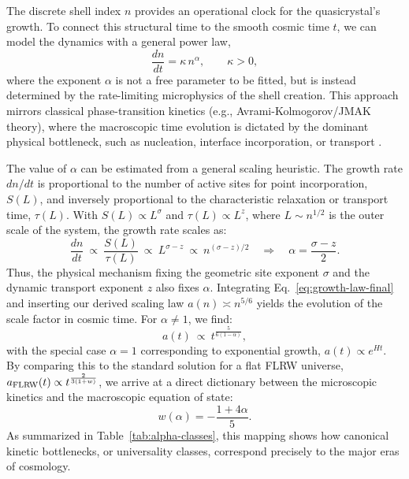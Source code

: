 \documentclass[universe,article,submit,pdftex,moreauthors]{Definitions/mdpi}
\begin{document}
The discrete shell index $n$ provides an operational clock for the quasicrystal's growth. To connect this structural time to the smooth cosmic time $t$, we can model the dynamics with a general power law,
\begin{equation}
  \frac{dn}{dt}=\kappa\,n^{\alpha},\qquad \kappa>0,
  \label{eq:growth-law-final}
\end{equation}
where the exponent $\alpha$ is not a free parameter to be fitted, but is instead determined by the rate-limiting microphysics of the shell creation. This approach mirrors classical phase-transition kinetics (e.g., Avrami-Kolmogorov/JMAK theory), where the macroscopic time evolution is dictated by the dominant physical bottleneck, such as nucleation, interface incorporation, or transport \cite{Shirzad2023}.

The value of $\alpha$ can be estimated from a general scaling heuristic. The growth rate $dn/dt$ is proportional to the number of active sites for point incorporation, $S(L)$, and inversely proportional to the characteristic relaxation or transport time, $\tau(L)$. With $S(L) \propto L^{\sigma}$ and $\tau(L) \propto L^{z}$, where $L \sim n^{1/2}$ is the outer scale of the system, the growth rate scales as:
\[
  \frac{dn}{dt}\ \propto\ \frac{S(L)}{\tau(L)}\ \propto\ L^{\sigma-z}\ \propto\ n^{(\sigma-z)/2}
  \quad\Rightarrow\quad
  \alpha=\frac{\sigma-z}{2}.
\]
Thus, the physical mechanism fixing the geometric site exponent $\sigma$ and the dynamic transport exponent $z$ also fixes $\alpha$. Integrating Eq.~\eqref{eq:growth-law-final} and inserting our derived scaling law $a(n)\asymp n^{5/6}$ yields the evolution of the scale factor in cosmic time. For $\alpha\neq 1$, we find:
\begin{equation}
  a(t)\ \propto\ t^{\frac{5}{6(1-\alpha)}},
\end{equation}
with the special case $\alpha=1$ corresponding to exponential growth, $a(t)\propto e^{Ht}$. By comparing this to the standard solution for a flat FLRW universe, $a_{\rm FLRW}(t) \propto t^{\frac{2}{3(1+w)}}$, we arrive at a direct dictionary between the microscopic kinetics and the macroscopic equation of state:
\begin{equation}
  w(\alpha)= -\frac{1+4\alpha}{5}.
\end{equation}
As summarized in Table~\ref{tab:alpha-classes}, this mapping shows how canonical kinetic bottlenecks, or universality classes, correspond precisely to the major eras of cosmology.
\end{document}
